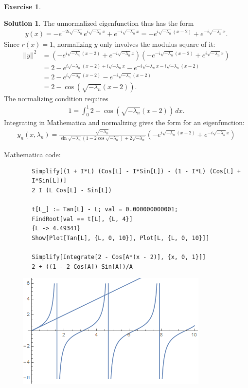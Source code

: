 \documentclass{article}
\theoremstyle{definition}
\newtheorem*{exer*}{Exercise}
\newtheorem*{sln*}{Solution}
\begin{document}
\begin{exer*}
\begin{enumerate}
\begin{sln*}
	 	The unnormalized eigenfunction thus has the form 
	 	\begin{align*}
	 	y(x) = -e^{-2i\sqrt{-\lambda_n}}e^{i\sqrt{-\lambda_n}x} + e^{-i\sqrt{-\lambda_n}x} = -e^{i\sqrt{-\lambda_n}(x-2)} + e^{-i\sqrt{-\lambda_n}x} .
	 	\end{align*}	
	 	Since $r(x) = 1$, normalizing $y$ only involves the modulus square of it:
	 	\begin{align*}
	 	\vert\vert y \vert\vert^2 &= (-e^{i\sqrt{-\lambda_n}(x-2)} + e^{-i\sqrt{-\lambda_n}x})(-e^{-i\sqrt{-\lambda_n}(x-2)} + e^{i\sqrt{-\lambda_n}x})\\
	 	&= 2 - e^{i\sqrt{-\lambda_n}(x-2) + i\sqrt{-\lambda_n}x} - e^{-i\sqrt{-\lambda_n}x  -i\sqrt{-\lambda_n}(x-2) }\\
	 	&= 2 - e^{i\sqrt{-\lambda_n}(x-2)} - e^{-i\sqrt{-\lambda_n}(x-2)}\\
	 	&= 2 - \cos\left(\sqrt{-\lambda_n} (x-2)\right).
	 	\end{align*}
	 	The normalizing condition requires 
	 	\begin{align*}
	 	1 = \int^1_0 2 - \cos\left(\sqrt{-\lambda_n} (x-2)\right)\,dx.
	 	\end{align*}
	 	Integrating in Mathematica and normalizing gives the form for an eigenfunction:
	 	\begin{align*}
	 	\boxed{y_n(x,\lambda_n) =  \frac{\sqrt{-\lambda_n}}{\sin\sqrt{-\lambda_n} (1- 2 \cos\sqrt{-\lambda_n})+2\sqrt{-\lambda_n}}\left( -e^{i\sqrt{-\lambda_n}(x-2)} + e^{-i\sqrt{-\lambda_n}x}  \right)}
	 	\end{align*}
	 	\end{sln*}
	 	
	 	Mathematica code:
	 	\begin{lstlisting}
	 	Simplify[(1 + I*L) (Cos[L] - I*Sin[L]) - (1 - I*L) (Cos[L] + 
	 	I*Sin[L])]
	 	2 I (L Cos[L] - Sin[L])
	 	
	 	t[L_] := Tan[L] - L; val = 0.000000000001; 
	 	FindRoot[val == t[L], {L, 4}]
	 	{L -> 4.49341}
	 	Show[Plot[Tan[L], {L, 0, 10}], Plot[L, {L, 0, 10}]]
	 	
	 	Simplify[Integrate[2 - Cos[A*(x - 2)], {x, 0, 1}]]
	 	2 + ((1 - 2 Cos[A]) Sin[A])/A
	 	\end{lstlisting}
	 	
	 	\begin{figure}[h!]
	 		\centering
	 		\includegraphics[scale=0.7]{pde_3_1.png}
	 	\end{figure}
	 	

\end{enumerate}
\end{exer*}
\end{document}
